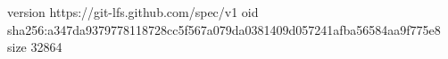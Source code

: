 version https://git-lfs.github.com/spec/v1
oid sha256:a347da9379778118728cc5f567a079da0381409d057241afba56584aa9f775e8
size 32864
